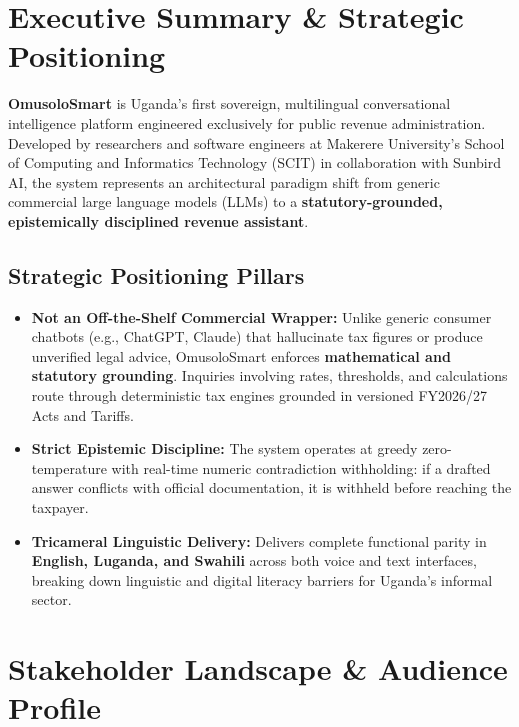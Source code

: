 \documentclass[10pt,a4paper]{article}
\begin{document}
\section{Executive Summary \& Strategic Positioning}

\textbf{OmusoloSmart} is Uganda's first sovereign, multilingual conversational intelligence platform engineered exclusively for public revenue administration. Developed by researchers and software engineers at Makerere University's School of Computing and Informatics Technology (SCIT) in collaboration with Sunbird AI, the system represents an architectural paradigm shift from generic commercial large language models (LLMs) to a \textbf{statutory-grounded, epistemically disciplined revenue assistant}.

\subsection{Strategic Positioning Pillars}
\begin{itemize}
  \item \textbf{Not an Off-the-Shelf Commercial Wrapper:} Unlike generic consumer chatbots (e.g., ChatGPT, Claude) that hallucinate tax figures or produce unverified legal advice, OmusoloSmart enforces \textbf{mathematical and statutory grounding}. Inquiries involving rates, thresholds, and calculations route through deterministic tax engines grounded in versioned FY2026/27 Acts and Tariffs.
  \item \textbf{Strict Epistemic Discipline:} The system operates at greedy zero-temperature with real-time numeric contradiction withholding: if a drafted answer conflicts with official documentation, it is withheld before reaching the taxpayer.
  \item \textbf{Tricameral Linguistic Delivery:} Delivers complete functional parity in \textbf{English, Luganda, and Swahili} across both voice and text interfaces, breaking down linguistic and digital literacy barriers for Uganda's informal sector.
\end{itemize}

\section{Stakeholder Landscape \& Audience Profile}
\end{document}
